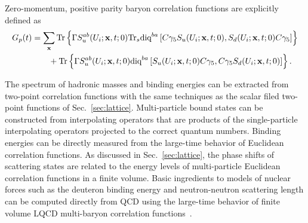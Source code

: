 Zero-momentum, positive parity baryon correlation functions are explicitly defined as
\begin{equation}
  \begin{split}
    G_{p}(t) &= \sum_{\mathbf{x}} \text{Tr}\left\lbrace \Gamma S_u^{ab}(U_i;\mathbf{x},t;0) \text{Tr}_s\text{diq}^{ba}\left[ C\gamma_5 S_u(U_i;\mathbf{x},t;0), S_d(U_i;\mathbf{x},t;0)C\gamma_5 \right]\right\rbrace\\
    &\hspace{20pt} +\text{Tr}\left\lbrace \Gamma S_u^{ab}(U_i;\mathbf{x},t;0) \text{diq}^{ba}\left[ S_u(U_i;\mathbf{x},t;0) C\gamma_5, C\gamma_5 S_d(U_i;\mathbf{x},t;0)  \right] \right\rbrace.
  \end{split}\label{eq:protoncorr}
\end{equation}

The spectrum of hadronic masses and binding energies can be extracted from two-point correlation functions with the same techniques as the scalar filed two-point functions of Sec.~\ref{sec:lattice}.
Multi-particle bound states can be constructed from interpolating operators that are products of the single-particle interpolating operators projected to the correct quantum numbers.
Binding energies can be directly measured from the large-time behavior of Euclidean correlation functions.
As discussed in Sec.~\ref{sec:lattice}, the phase shifts of scattering states are related to the energy levels of multi-particle Euclidean correlation functions in a finite volume.
Basic ingredients to models of nuclear forces such as the deuteron binding energy and neutron-neutron scattering length can be computed directly from QCD using the large-time behavior of finite volume LQCD multi-baryon correlation functions~\cite{Luscher:1985dn,Luscher:1986pf,Luscher:1990ux,Aoki:2002in,Beane:2003da}.


